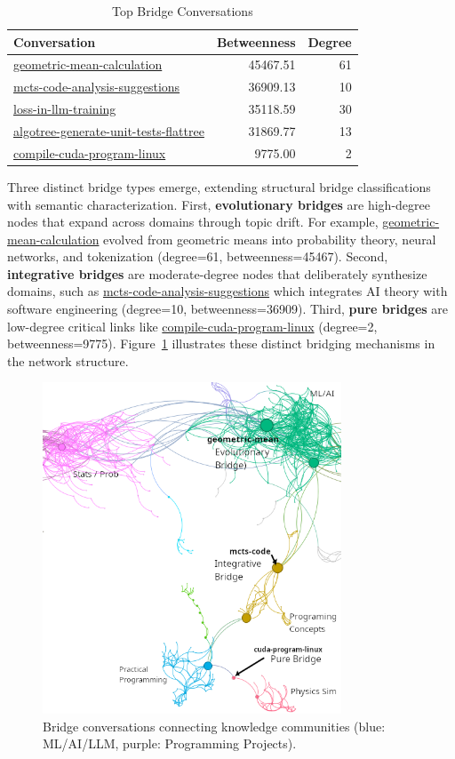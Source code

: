 \documentclass{svproc}
\begin{document}
\begin{table}
\centering
\caption{Top Bridge Conversations}
\label{tab:bridges}
\begin{tabular}{lrr}
\toprule
\textbf{Conversation} & \textbf{Betweenness} & \textbf{Degree} \\
\midrule
\url{geometric-mean-calculation} & 45467.51 & 61 \\
\url{mcts-code-analysis-suggestions} & 36909.13 & 10 \\
\url{loss-in-llm-training} & 35118.59 & 30 \\
\url{algotree-generate-unit-tests-flattree} & 31869.77 & 13 \\
\url{compile-cuda-program-linux} & 9775.00 & 2 \\
\bottomrule
\end{tabular}
\end{table}

Three distinct bridge types emerge, extending structural bridge classifications \cite{granovetter1973,burt1992} with semantic characterization. First, \textbf{evolutionary bridges} are high-degree nodes that expand across domains through topic drift. For example, \url{geometric-mean-calculation} evolved from geometric means into probability theory, neural networks, and tokenization (degree=61, betweenness=45467). Second, \textbf{integrative bridges} are moderate-degree nodes that deliberately synthesize domains, such as \url{mcts-code-analysis-suggestions} which integrates AI theory with software engineering (degree=10, betweenness=36909). Third, \textbf{pure bridges} are low-degree critical links like \url{compile-cuda-program-linux} (degree=2, betweenness=9775). Figure~\ref{fig:bridge_zoom} illustrates these distinct bridging mechanisms in the network structure.

\begin{figure}[!h] %
\centering
\includegraphics[width=3.5in]{./images/bridge-better.png}
\caption{Bridge conversations connecting knowledge communities (blue: ML/AI/LLM, purple: Programming Projects).}
\label{fig:bridge_zoom}
\end{figure}
\end{document}
